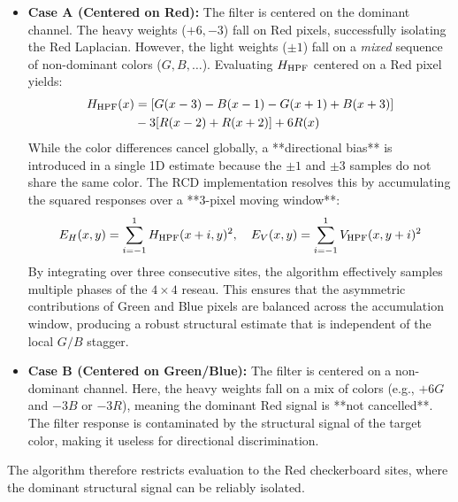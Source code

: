 \documentclass[a4paper,11pt]{article}
\begin{document}
\begin{itemize}
    \item \textbf{Case A (Centered on Red):} The filter is centered on the dominant channel. The heavy weights ($+6, -3$) fall on Red pixels, successfully isolating the Red Laplacian. However, the light weights ($\pm1$) fall on a \emph{mixed} sequence of non-dominant colors ($G, B, \dots$). Evaluating $H_{\rm HPF}$ centered on a Red pixel yields:
    \begin{align*}
        H_{\rm HPF}(x) &= [G(x-3) - B(x-1) - G(x+1) + B(x+3)] \\
                       &- 3[R(x-2) + R(x+2)] + 6R(x)
    \end{align*}
    While the color differences cancel globally, a **directional bias** is introduced in a single 1D estimate because the $\pm1$ and $\pm3$ samples do not share the same color. The RCD implementation resolves this by accumulating the squared responses over a **3-pixel moving window**:
    \begin{equation*}
        E_{H}(x,y) = \sum_{i=-1}^{1} H_{\rm HPF}(x+i, y)^2, \quad E_{V}(x,y) = \sum_{i=-1}^{1} V_{\rm HPF}(x, y+i)^2
    \end{equation*}
    By integrating over three consecutive sites, the algorithm effectively samples multiple phases of the $4\times4$ reseau. This ensures that the asymmetric contributions of Green and Blue pixels are balanced across the accumulation window, producing a robust structural estimate that is independent of the local $G/B$ stagger.
    
    \item \textbf{Case B (Centered on Green/Blue):} The filter is centered on a non-dominant channel. Here, the heavy weights fall on a mix of colors (e.g., $+6G$ and $-3B$ or $-3R$), meaning the dominant Red signal is **not cancelled**. The filter response is contaminated by the structural signal of the target color, making it useless for directional discrimination. 
\end{itemize}

The algorithm therefore restricts evaluation to the Red checkerboard sites, where the dominant structural signal can be reliably isolated.
\end{document}
